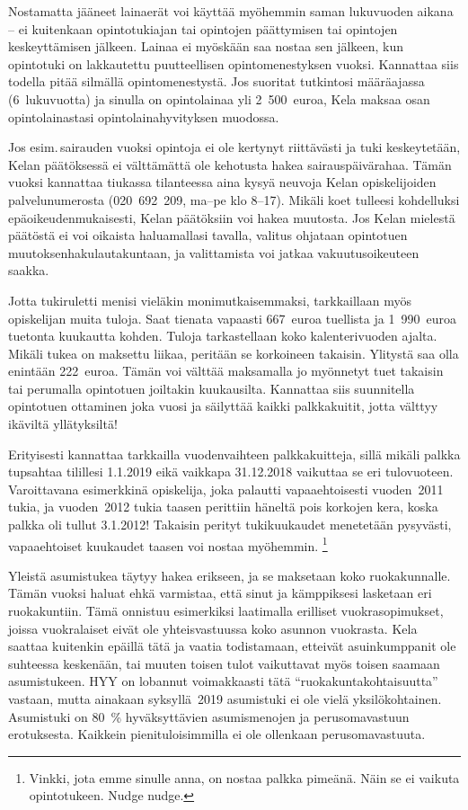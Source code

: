 \documentclass[a5paper, 8pt, twocolumn]{book} %
\numberwithin{equation}{section}
\begin{document}
Nostamatta
jääneet lainaerät voi käyttää myöhemmin
saman lukuvuoden aikana -- ei kuitenkaan
opintotukiajan tai opintojen päättymisen
tai opintojen keskeyttämisen jälkeen. Lainaa
ei myöskään saa nostaa sen jälkeen,
kun opintotuki on lakkautettu puutteellisen
opintomenestyksen vuoksi. Kannattaa siis
todella pitää silmällä opintomenestystä. Jos suoritat tutkintosi määräajassa (6~lukuvuotta) ja sinulla on opintolainaa yli 2~500~euroa, Kela maksaa osan opintolainastasi opintolainahyvityksen muodossa.

Jos esim.\,sairauden vuoksi opintoja ei ole kertynyt riittävästi ja
tuki keskeytetään, Kelan päätöksessä ei välttämättä ole
kehotusta hakea sairauspäivärahaa. Tämän vuoksi kannattaa tiukassa tilanteessa aina kysyä neuvoja Kelan opiskelijoiden palvelunumerosta (020~692~209, ma--pe klo 8--17). Mikäli koet tulleesi kohdelluksi epäoikeudenmukaisesti, Kelan päätöksiin voi hakea muutosta. Jos Kelan mielestä päätöstä ei voi oikaista haluamallasi tavalla, valitus ohjataan opintotuen muutoksenhakulautakuntaan, ja valittamista voi jatkaa vakuutusoikeuteen saakka. 

Jotta tukiruletti menisi vieläkin monimutkaisemmaksi,
tarkkaillaan myös opiskelijan
muita tuloja. Saat tienata vapaasti
667~euroa tuellista ja 1~990~euroa tuetonta
kuukautta kohden. Tuloja tarkastellaan
koko kalenterivuoden ajalta. Mikäli tukea
on maksettu liikaa, peritään se korkoineen
takaisin. Ylitystä saa olla enintään
222~euroa. Tämän voi välttää maksamalla
jo myönnetyt tuet takaisin tai perumalla
opintotuen joiltakin kuukausilta. Kannattaa
siis suunnitella opintotuen ottaminen joka
vuosi ja säilyttää kaikki palkkakuitit, jotta
välttyy ikäviltä yllätyksiltä!

Erityisesti kannattaa tarkkailla vuodenvaihteen
palkkakuitteja, sillä mikäli palkka
tupsahtaa tilillesi 1.1.2019 eikä vaikkapa
31.12.2018 vaikuttaa se eri tulovuoteen.
Varoittavana esimerkkinä opiskelija, joka
palautti vapaaehtoisesti vuoden~2011 tukia,
ja vuoden~2012 tukia taasen perittiin häneltä
pois korkojen kera, koska palkka oli tullut
3.1.2012! Takaisin perityt tukikuukaudet
menetetään pysyvästi, vapaaehtoiset
kuukaudet taasen voi nostaa myöhemmin.
\footnote{Vinkki, jota emme sinulle anna, on nostaa
palkka pimeänä. Näin se ei vaikuta opintotukeen.
Nudge nudge.}

Yleistä asumistukea täytyy hakea erikseen, ja se maksetaan koko ruokakunnalle. Tämän vuoksi haluat ehkä varmistaa, että sinut ja kämppiksesi lasketaan eri ruokakuntiin. Tämä onnistuu esimerkiksi laatimalla erilliset vuokrasopimukset, joissa vuokralaiset eivät ole yhteisvastuussa koko asunnon vuokrasta. Kela saattaa kuitenkin epäillä tätä ja vaatia todistamaan, etteivät asuinkumppanit ole suhteessa keskenään, tai muuten toisen tulot vaikuttavat myös toisen saamaan asumistukeen. HYY on lobannut voimakkaasti tätä ``ruokakuntakohtaisuutta'' vastaan, mutta ainakaan syksyllä~2019 asumistuki ei ole vielä yksilökohtainen. Asumistuki on 80~\% hyväksyttävien asumismenojen ja perusomavastuun erotuksesta. Kaikkein pienituloisimmilla ei ole ollenkaan perusomavastuuta. 
\end{document}
